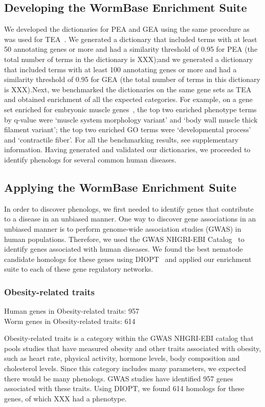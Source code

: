 \documentclass[10pt,letterpaper,twocolumn]{article}
\newcommand{\hobesity}{957}
\newcommand{\wobesity}{614}
\begin{document}
\subsection*{Developing the WormBase Enrichment Suite}
We developed the dictionaries for PEA and GEA using the same procedure as was
used for TEA~\cite{}. We generated a dictionary that included terms with at
least 50 annotating genes or more and had a similarity threshold of 0.95 for PEA
(the total number of terms in the dictionary is XXX);\@ and we generated a
dictionary that included terms with at least 100 annotating genes or more and
had a similarity threshold of 0.95 for GEA (the total number of terms in this
dictionary is XXX).\@ Next, we benchmarked the dictionaries on the same gene
sets as TEA and obtained enrichment of all the expected categories. For example,
on a gene set enriched for embryonic muscle genes~\cite{}, the top two enriched
phenotype terms by q-value were `muscle system morphology variant' and `body
wall muscle thick filament variant'; the top two enriched GO terms were
`developmental process' and `contractile fiber'. For all the benchmarking
results, see supplementary information. Having generated and validated our
dictionaries, we proceeded to identify phenologs for several common human diseases.

\subsection*{Applying the WormBase Enrichment Suite}
In order to discover phenologs, we first needed to identify genes that
contribute to a disease in an unbiased manner. One way to discover gene
associations in an unbiased manner is to perform genome-wide association
studies (GWAS) in human populations. Therefore, we used the GWAS NHGRI-EBI
Catalog~\cite{} to identify genes associated with human diseases. We found the
best nematode candidate homologs for these genes using DIOPT~\cite{} and applied
our enrichment suite to each of these gene regulatory networks.

\subsubsection*{Obesity-related traits}
Human genes in Obesity-related traits: 957\\
Worm genes in Obesity-related traits: 614

Obesity-related traits is a category within the GWAS NHGRI-EBI catalog that
pools studies that have measured obesity and other traits associated with
obesity, such as heart rate, physical activity, hormone levels, body composition
and cholesterol levels. Since this category includes many parameters,
we expected there would be many phenologs. GWAS studies have identified
\hobesity{} genes associated with these traits. Using DIOPT, we found
\wobesity{} homologs for these genes, of which XXX had a phenotype. 
\end{document}
